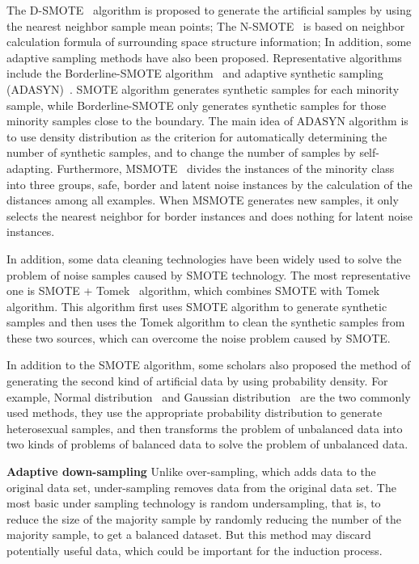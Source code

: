 The D-SMOTE~\cite{ref_10} algorithm is proposed to generate the artificial samples by using the nearest neighbor sample mean points; The N-SMOTE~\cite{ref_11} is based on neighbor calculation formula of surrounding space structure information; In addition, some adaptive sampling methods have also been proposed. Representative algorithms include the Borderline-SMOTE algorithm~\cite{ref_4} and adaptive synthetic sampling (ADASYN)~\cite{ref_5}. SMOTE algorithm generates synthetic samples for each minority sample, while Borderline-SMOTE only generates synthetic samples for those minority samples close to the boundary. The main idea of ADASYN algorithm is to use density distribution as the criterion for automatically determining the number of synthetic samples, and to change the number of samples by self-adapting. Furthermore, MSMOTE~\cite{ref_12} divides the instances of the minority class into three groups, safe, border and latent noise instances by the calculation of the distances among all examples. When MSMOTE generates new samples, it only selects the nearest neighbor for border instances and does nothing for latent noise instances.

In addition, some data cleaning technologies have been widely used to solve the problem of noise samples caused by SMOTE technology. The most representative one is SMOTE + Tomek~\cite{ref_13} algorithm, which combines SMOTE with Tomek algorithm. This algorithm first uses SMOTE algorithm to generate synthetic samples and then uses the Tomek algorithm to clean the synthetic samples from these two sources, which can overcome the noise problem caused by SMOTE.

In addition to the SMOTE algorithm, some scholars also proposed the method of generating the second kind of artificial data by using probability density. For example, Normal distribution~\cite{ref_14} and Gaussian distribution~\cite{ref_15} are the two commonly used methods, they use the appropriate probability distribution to generate heterosexual samples, and then transforms the problem of unbalanced data into two kinds of problems of balanced data to solve the problem of unbalanced data. 

\textbf{Adaptive down-sampling} Unlike over-sampling, which adds data to the original data set, under-sampling removes data from the original data set. The most basic under sampling technology is random undersampling, that is, to reduce the size of the majority sample by randomly reducing the number of the majority sample, to get a balanced dataset. But this method may discard potentially useful data, which could be important for the induction process.

